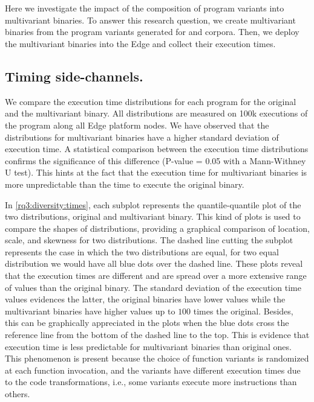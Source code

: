 \section{\rqthree}
\label{results:rq3}

Here we investigate the impact of the composition of program variants into multivariant binaries.
To answer this research question, we create multivariant binaries from the program variants generated for \corpussodium and \corpusqrcode corpora. Then, we deploy the multivariant binaries into the Edge and collect their execution times. 

\subsection*{Timing side-channels.}

We compare the execution time distributions for each program for the original and the multivariant binary. All distributions are measured on 100k executions of the program along all Edge platform nodes.
We have observed that the distributions for multivariant binaries have a higher standard deviation of execution time.
A statistical comparison between the execution time distributions confirms the significance of this difference (P-value = 0.05 with a  Mann-Withney U test). This hints at the fact that the execution time for multivariant binaries is more unpredictable than the time to execute the original binary. 


In \autoref{rq3:diversity:times}, each subplot represents the quantile-quantile plot \cite{gnanadesikan1968probability} of the two distributions, original and multivariant binary.
This kind of plots is used to compare the shapes of distributions, providing a graphical comparison of location, scale, and skewness for two distributions.
The dashed line cutting the subplot represents the case in which the two distributions are equal, \ie for two equal distribution we would have all blue dots over the dashed line. These plots reveal that the execution times are different and are spread over a more extensive range of values than the original binary.
The standard deviation of the execution time values evidences the latter, the original binaries have lower values while the multivariant binaries have higher values up to $100$ times the original. Besides, this can be graphically appreciated in the plots when the blue dots cross the reference line from the bottom of the dashed line to the top.
This is evidence that execution time is less predictable for multivariant binaries than original ones.
This phenomenon is present because the choice of function variants is randomized at each function invocation, and the variants have different execution times due to the code transformations, i.e., some variants execute more instructions than others. 
 

